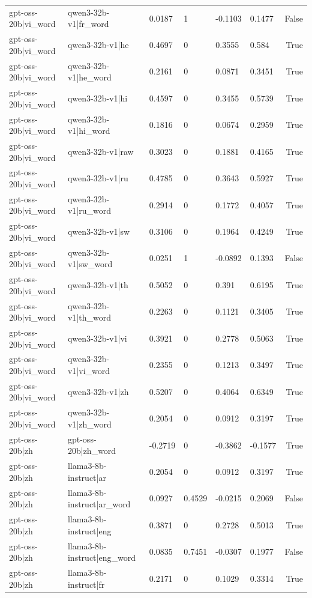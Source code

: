\begin{table}
\begin{tabular}{llllllr}
gpt-oss-20b|vi_word & qwen3-32b-v1|fr_word & 0.0187 & 1 & -0.1103 & 0.1477 & False \\
gpt-oss-20b|vi_word & qwen3-32b-v1|he & 0.4697 & 0 & 0.3555 & 0.584 & True \\
gpt-oss-20b|vi_word & qwen3-32b-v1|he_word & 0.2161 & 0 & 0.0871 & 0.3451 & True \\
gpt-oss-20b|vi_word & qwen3-32b-v1|hi & 0.4597 & 0 & 0.3455 & 0.5739 & True \\
gpt-oss-20b|vi_word & qwen3-32b-v1|hi_word & 0.1816 & 0 & 0.0674 & 0.2959 & True \\
gpt-oss-20b|vi_word & qwen3-32b-v1|raw & 0.3023 & 0 & 0.1881 & 0.4165 & True \\
gpt-oss-20b|vi_word & qwen3-32b-v1|ru & 0.4785 & 0 & 0.3643 & 0.5927 & True \\
gpt-oss-20b|vi_word & qwen3-32b-v1|ru_word & 0.2914 & 0 & 0.1772 & 0.4057 & True \\
gpt-oss-20b|vi_word & qwen3-32b-v1|sw & 0.3106 & 0 & 0.1964 & 0.4249 & True \\
gpt-oss-20b|vi_word & qwen3-32b-v1|sw_word & 0.0251 & 1 & -0.0892 & 0.1393 & False \\
gpt-oss-20b|vi_word & qwen3-32b-v1|th & 0.5052 & 0 & 0.391 & 0.6195 & True \\
gpt-oss-20b|vi_word & qwen3-32b-v1|th_word & 0.2263 & 0 & 0.1121 & 0.3405 & True \\
gpt-oss-20b|vi_word & qwen3-32b-v1|vi & 0.3921 & 0 & 0.2778 & 0.5063 & True \\
gpt-oss-20b|vi_word & qwen3-32b-v1|vi_word & 0.2355 & 0 & 0.1213 & 0.3497 & True \\
gpt-oss-20b|vi_word & qwen3-32b-v1|zh & 0.5207 & 0 & 0.4064 & 0.6349 & True \\
gpt-oss-20b|vi_word & qwen3-32b-v1|zh_word & 0.2054 & 0 & 0.0912 & 0.3197 & True \\
gpt-oss-20b|zh & gpt-oss-20b|zh_word & -0.2719 & 0 & -0.3862 & -0.1577 & True \\
gpt-oss-20b|zh & llama3-8b-instruct|ar & 0.2054 & 0 & 0.0912 & 0.3197 & True \\
gpt-oss-20b|zh & llama3-8b-instruct|ar_word & 0.0927 & 0.4529 & -0.0215 & 0.2069 & False \\
gpt-oss-20b|zh & llama3-8b-instruct|eng & 0.3871 & 0 & 0.2728 & 0.5013 & True \\
gpt-oss-20b|zh & llama3-8b-instruct|eng_word & 0.0835 & 0.7451 & -0.0307 & 0.1977 & False \\
gpt-oss-20b|zh & llama3-8b-instruct|fr & 0.2171 & 0 & 0.1029 & 0.3314 & True \\

\end{tabular}
\end{table}
